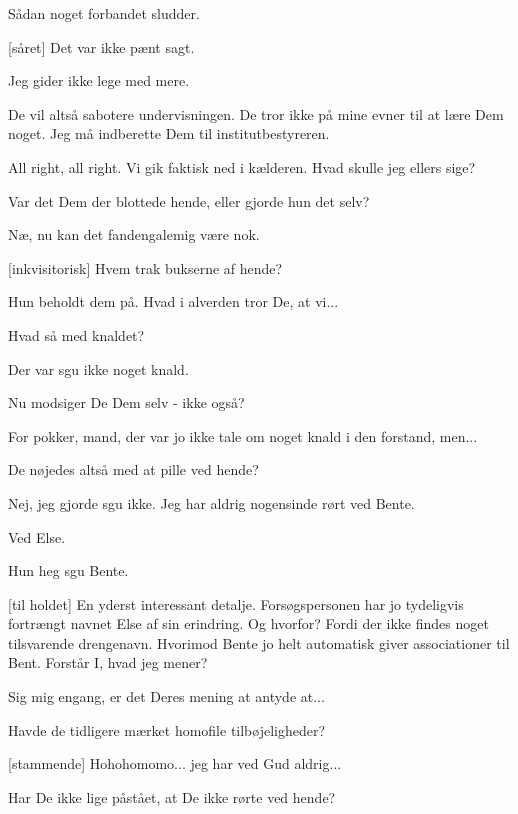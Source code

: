 \documentclass[a4paper,11pt]{article}
\begin{document}
\begin{sketch}
 Sådan noget forbandet sludder.

[såret] Det var ikke pænt sagt.

 Jeg gider ikke lege med mere.

 De vil altså sabotere undervisningen.  De
tror ikke på mine evner til at lære Dem noget.  Jeg må indberette Dem
til institutbestyreren.

 All right, all right.  Vi gik faktisk ned i
kælderen.  Hvad skulle jeg ellers sige?

 Var det Dem der blottede hende, eller gjorde hun det selv?

 Næ, nu kan det fandengalemig være nok.

[inkvisitorisk] Hvem trak bukserne af hende?

 Hun beholdt dem på.  Hvad i alverden tror De, at vi...

 Hvad så med knaldet?

 Der var sgu ikke noget knald.

 Nu modsiger De Dem selv - ikke også?  

 For pokker, mand, der var jo ikke tale om noget knald i den forstand, men...

 De nøjedes altså med at pille ved hende?

 Nej, jeg gjorde sgu ikke.  Jeg har aldrig nogensinde rørt ved Bente.

 Ved Else.

 Hun heg sgu Bente.

[til holdet] En yderst interessant detalje.  Forsøgspersonen
har jo tydeligvis fortrængt navnet Else af sin erindring.  Og hvorfor?
Fordi der ikke findes noget tilsvarende drengenavn.  Hvorimod Bente jo
helt automatisk giver associationer til Bent.  Forstår I, hvad jeg mener?


 Sig mig engang, er det Deres mening at antyde at...

 Havde de tidligere mærket homofile tilbøjeligheder?

[stammende] Hohohomomo... jeg har ved Gud aldrig...

 Har De ikke lige påstået, at De ikke rørte ved hende?


\end{sketch}
\end{document}
